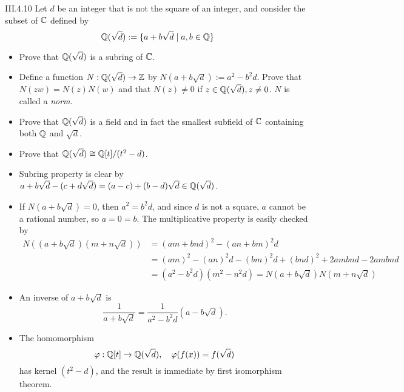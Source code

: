 \begin{problem}{III.4.10}
Let $d$ be an integer that is not the square of an integer, and consider the subset of $\mathbb{C}$ defined by 
\[
\mathbb{Q}(\sqrt{d}) := \{a+b\sqrt{d} \;| \; a,b \in \mathbb{Q}\}	
\] 
\begin{itemize}
    \setlength\itemsep{0pt}
    \item Prove that $\mathbb{Q}(\sqrt{d})$ is a subring of $\mathbb{C}$.
    \item Define a function $N:\mathbb{Q}(\sqrt{d}) \to \mathbb{Z}$ by $N(a+b\sqrt{d}) := a^2 - b^2d$. Prove that $N(zw) = N(z)N(w)$ and that $N(z)\neq 0$ if $z \in \mathbb{Q}(\sqrt{d}), z \neq 0$. $N$ is called a \emph{norm}.
    \item Prove that $\mathbb{Q}(\sqrt{d})$ is a field and in fact the smallest subfield of $\mathbb{C}$ containing both $\mathbb{Q}$ and $\sqrt{d}$.
    \item Prove that $\mathbb{Q}(\sqrt{d}) \cong \mathbb{Q}[t]/(t^2-d)$.
\end{itemize}
\end{problem}
\begin{pf}
\begin{itemize}
    \item Subring property is clear by $a+b\sqrt{d} - (c+d\sqrt{d}) = (a-c) + (b-d)\sqrt{d} \in \mathbb{Q}(\sqrt{d})$.
    \item If $N(a+b\sqrt{d}) = 0$, then $a^2 = b^2d$, and since $d$ is not a square, $a$ cannot be a rational number, so $a = 0 = b$. The multiplicative property is easily checked by 
    \begin{align*}
    N((a+b\sqrt{d})(m+n\sqrt{d})) &= (am+bnd)^2 - (an+bm)^2d \\
    &= (am)^2 - (an)^2d - (bm)^2d + (bnd)^2 +2ambnd-2ambnd \\
    &= (a^2-b^2d)(m^2-n^2d) = N(a+b\sqrt{d})N(m+n\sqrt{d})
    \end{align*}
    \item An inverse of $a+b\sqrt{d}$ is
    \[
    \frac{1}{a+b\sqrt{d}} = \frac{1}{a^2-b^2d}\left(a-b\sqrt{d}\right).
    \]
    \item The homomorphism
    \[
    \varphi: \mathbb{Q}[t] \to \mathbb{Q}(\sqrt{d}), \quad \varphi(f(x)) = f(\sqrt{d})	
    \]
    has kernel $(t^2-d)$, and the result is immediate by first isomorphism theorem. 
\end{itemize}
\end{pf}

